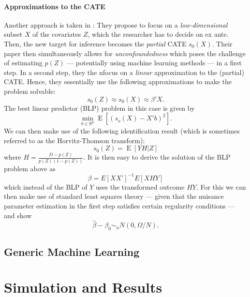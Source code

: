 \documentclass[11pt, a4paper, leqno]{article}
\DeclareMathOperator{\E}{E}
\begin{document}
\paragraph*{Approximations to the CATE}
Another approach is taken in \cite{semenova2021debiased}:
They propose to focus on a \textit{low-dimensional} subset $X$ of the covariates $Z$, which the researcher has to decide on ex ante.
Then, the new target for inference becomes the \textit{partial} CATE $s_0(X)$.
Their paper then simultaneously allows for \textit{unconfoundedness} which poses the challenge of estimating $p(Z)$ --- potentially using machine learning methods --- in a first step.
In a second step, they the nfocus on a \textit{linear} approximation to the (partial) CATE.
Hence, they essentially use the following approximations to make the problem solvable:
\begin{equation*}
    s_0(Z) \approx s_0(X) \approx \beta'X.
\end{equation*}
The best linear predictor (BLP) problem in this case is given by
\begin{equation*}
    \min_{b\in\mathbb{R}^p} \E [(s_o(X) - X'b)^2].
\end{equation*}
We can then make use of the following identification result (which is sometimes referred to as the Horvitz-Thomson transform):
\begin{equation*}
    s_0(Z) = \E[YH|Z]
\end{equation*}
where $H = \frac{D-p(Z)}{p(Z)(1-p(Z))}$.
It is then easy to derive the solution of the BLP problem above as
\begin{equation*}
    \beta = E[XX']^{-1}E[XHY]
\end{equation*}
which instead of the BLP of $Y$ uses the transformed outcome $HY$.
For this we can then make use of standard least squares theory --- given that the nuisance parameter estimation in the first step satisfies certain regularity conditions --- and show
\begin{equation*}
    \hat{\beta} - \beta_0 \sim_a N(0, \Omega/N).
\end{equation*}
\subsection{Generic Machine Learning}

\section{Simulation and Results}




\clearpage
\newpage

\printbibliography
{}


\end{document}

